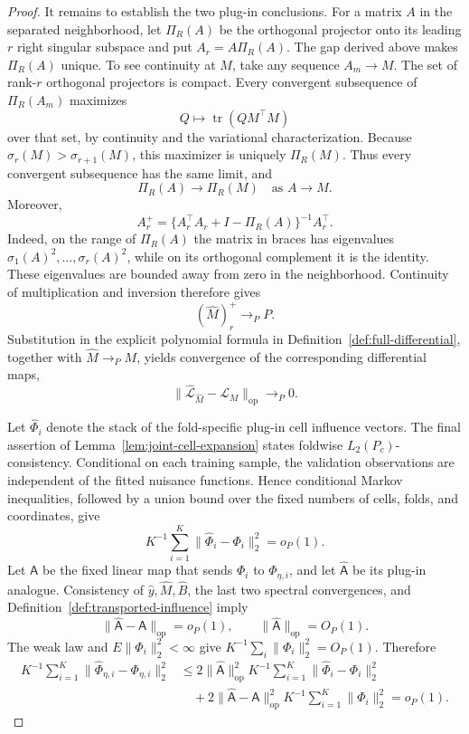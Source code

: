 \documentclass{article}
\begin{document}
\begin{proof}
It remains to establish the two plug-in conclusions. For a matrix \(A\) in the separated neighborhood, let \(\Pi_R(A)\) be the orthogonal projector onto its leading \(r\) right singular subspace and put \(A_r=A\Pi_R(A)\). The gap derived above makes \(\Pi_R(A)\) unique. To see continuity at \(M\), take any sequence \(A_m\to M\). The set of rank-\(r\) orthogonal projectors is compact. Every convergent subsequence of \(\Pi_R(A_m)\) maximizes
\[
 Q\longmapsto \operatorname{tr}(QM^\top M)
\]
over that set, by continuity and the variational characterization. Because \(\sigma_r(M)>\sigma_{r+1}(M)\), this maximizer is uniquely \(\Pi_R(M)\). Thus every convergent subsequence has the same limit, and
\[
 \Pi_R(A)\to\Pi_R(M)
 \quad\text{as }A\to M.
\]
Moreover,
\[
 A_r^+=\{A_r^\top A_r+I-\Pi_R(A)\}^{-1}A_r^\top.
\]
Indeed, on the range of \(\Pi_R(A)\) the matrix in braces has eigenvalues \(\sigma_1(A)^2,\ldots,\sigma_r(A)^2\), while on its orthogonal complement it is the identity. These eigenvalues are bounded away from zero in the neighborhood. Continuity of multiplication and inversion therefore gives
\[
 (\widehat M)_r^+\to_PP.
\]
Substitution in the explicit polynomial formula in Definition~\ref{def:full-differential}, together with \(\widehat M\to_PM\), yields convergence of the corresponding differential maps,
\[
 \|\widehat{\mathcal L}_{\widehat M}-\mathcal L_M\|_{\mathrm{op}}\to_P0.
\]

Let \(\widehat\Phi_i\) denote the stack of the fold-specific plug-in cell influence vectors. The final assertion of Lemma~\ref{lem:joint-cell-expansion} states foldwise \(L_2(P_c)\)-consistency. Conditional on each training sample, the validation observations are independent of the fitted nuisance functions. Hence conditional Markov inequalities, followed by a union bound over the fixed numbers of cells, folds, and coordinates, give
\[
 K^{-1}\sum_{i=1}^K\|\widehat\Phi_i-\Phi_i\|_2^2=o_P(1).
\]
Let \(\mathsf A\) be the fixed linear map that sends \(\Phi_i\) to \(\Phi_{\eta,i}\), and let \(\widehat{\mathsf A}\) be its plug-in analogue. Consistency of \(\widehat y,\widehat M,\widehat B\), the last two spectral convergences, and Definition~\ref{def:transported-influence} imply
\[
 \|\widehat{\mathsf A}-\mathsf A\|_{\mathrm{op}}=o_P(1),
 \qquad
 \|\widehat{\mathsf A}\|_{\mathrm{op}}=O_P(1).
\]
The weak law and \(E\|\Phi_i\|_2^2<\infty\) give \(K^{-1}\sum_i\|\Phi_i\|_2^2=O_P(1)\). Therefore
\[
\begin{aligned}
 K^{-1}\sum_{i=1}^K
 \|\widehat\Phi_{\eta,i}-\Phi_{\eta,i}\|_2^2
 &\le
 2\|\widehat{\mathsf A}\|_{\mathrm{op}}^2
 K^{-1}\sum_{i=1}^K\|\widehat\Phi_i-\Phi_i\|_2^2\\
 &\quad+
 2\|\widehat{\mathsf A}-\mathsf A\|_{\mathrm{op}}^2
 K^{-1}\sum_{i=1}^K\|\Phi_i\|_2^2
 =o_P(1).
\end{aligned}
\]


\end{proof}
\end{document}
